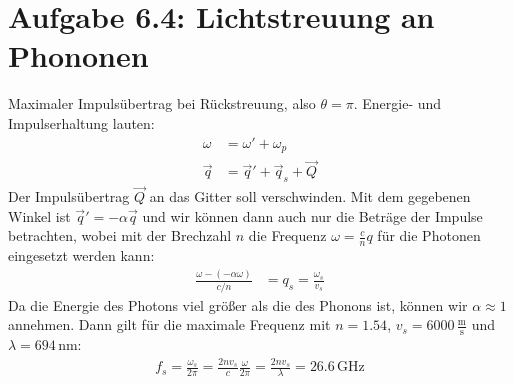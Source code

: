 \documentclass[a4paper,12pt]{article}
\newcommand{\tecxt}{}
\begin{document}
\section*{Aufgabe 6.4: Lichtstreuung an Phononen}
Maximaler Impulsübertrag bei Rückstreuung, also $\theta=\pi$. Energie- und Impulserhaltung lauten:
\begin{align*}
\omega&=\omega'+\omega_p\\
\vec{q}&=\vec{q}'+\vec{q}_s+\vec{Q}
\end{align*}
Der Impulsübertrag $\vec{Q}$ an das Gitter soll verschwinden. Mit dem gegebenen Winkel ist $\vec{q}'=-\alpha\vec{q}$ und wir können dann auch nur die Beträge der Impulse betrachten, wobei mit der Brechzahl $n$ die Frequenz $\omega=\frac{c}{n} q$ für die Photonen eingesetzt werden kann:
\begin{align*}
\frac{\omega-(-\alpha\omega)}{c/n}&=q_s=\frac{\omega_s}{v_s}
\end{align*}
Da die Energie des Photons viel größer als die des Phonons ist, können wir $\alpha\approx 1$ annehmen. Dann gilt für die maximale Frequenz mit $n=1.54$, $v_s=6000\,\frac{\tecxt\text{m}}{\tecxt\text{s}}$ und $\lambda=694\,$nm:
\begin{align*}
f_s=\frac{\omega_s}{2\pi}=\frac{2nv_s}{c}\frac{\omega}{2\pi}=\frac{2nv_s}{\lambda}=26.6\,\tecxt\text{GHz}
\end{align*}
\end{document}

